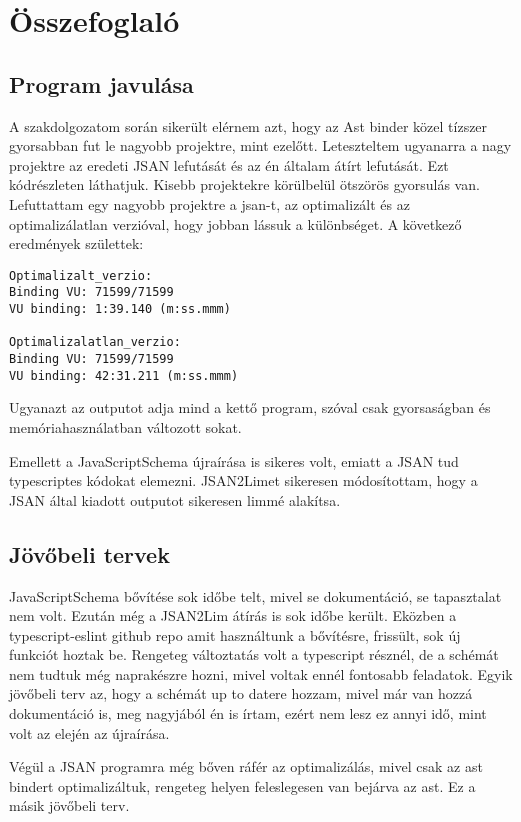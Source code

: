 \chapter{Összefoglaló}\label{chap:Összefoglaló}

\section{Program javulása}

\noindent

A szakdolgozatom során sikerült elérnem azt, hogy az Ast binder közel tízszer gyorsabban fut le nagyobb projektre, mint ezelőtt.
Leteszteltem ugyanarra a nagy projektre az eredeti JSAN lefutását és az én általam átírt lefutását. Ezt  kódrészleten láthatjuk.
Kisebb projektekre körülbelül ötszörös gyorsulás van.
Lefuttattam egy nagyobb projektre a jsan-t, az optimalizált és az optimalizálatlan verzióval, hogy jobban lássuk a különbséget. A következő eredmények születtek:

\begin{lstlisting}[caption={JSAN lefutási idő előtte és utána}, label={lst:jsan_before_after_comparison}]
Optimalizalt_verzio:
Binding VU: 71599/71599
VU binding: 1:39.140 (m:ss.mmm)

Optimalizalatlan_verzio:
Binding VU: 71599/71599
VU binding: 42:31.211 (m:ss.mmm)
\end{lstlisting}

Ugyanazt az outputot adja mind a kettő program, szóval csak gyorsaságban és memóriahasználatban változott sokat.

Emellett a JavaScriptSchema újraírása is sikeres volt, emiatt a JSAN tud typescriptes kódokat elemezni.
JSAN2Limet sikeresen módosítottam, hogy a JSAN által kiadott outputot sikeresen limmé alakítsa.
\section{Jövőbeli tervek}

\noindent

JavaScriptSchema bővítése sok időbe telt, mivel se dokumentáció, se tapasztalat nem volt. Ezután még a JSAN2Lim átírás is sok időbe került.
Eközben a typescript-eslint github repo amit használtunk a bővítésre, frissült, sok új funkciót hoztak be.
Rengeteg változtatás volt a typescript résznél, de a schémát nem tudtuk még naprakészre hozni, mivel voltak ennél fontosabb feladatok.
Egyik jövőbeli terv az, hogy a schémát up to datere hozzam, mivel már van hozzá dokumentáció is, meg nagyjából én is írtam, ezért nem lesz ez annyi idő, mint volt az elején az újraírása.

\noindent

Végül a JSAN programra még bőven ráfér az optimalizálás, mivel csak az ast bindert optimalizáltuk, rengeteg helyen feleslegesen van bejárva az ast.
Ez a másik jövőbeli terv.
